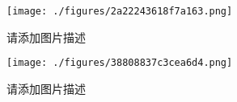 
\begin{issues}
\issueDraft
\end{issues}

\begin{figure}[ht]
\centering
\texttt{[image: ./figures/2a22243618f7a163.png]}
\caption{请添加图片描述} \label{fig_PhText_1}
\end{figure}

\begin{figure}[ht]
\centering
\texttt{[image: ./figures/38808837c3cea6d4.png]}
\caption{请添加图片描述} \label{fig_PhText_2}
\end{figure}